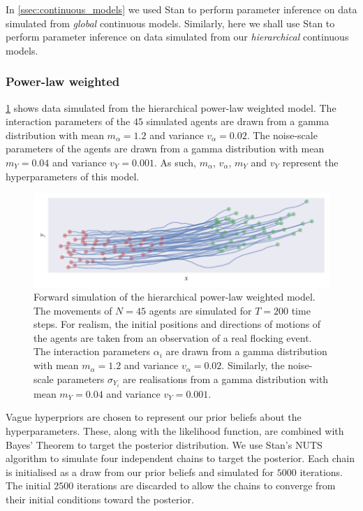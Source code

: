 In \cref{ssec:continuous_models} we used Stan to perform parameter inference on
data simulated from \emph{global} continuous models. Similarly, here we shall
use Stan to perform parameter inference on data simulated from our
\emph{hierarchical} continuous models.

\subsubsection{Power-law weighted}

\cref{fig:power_hier_sim} shows data simulated from the hierarchical power-law
weighted model. The interaction parameters of the $45$ simulated agents are
drawn from a gamma distribution with mean $m_{\alpha}=1.2$ and variance
$v_{\alpha}=0.02$. The noise-scale parameters of the agents are drawn from a
gamma distribution with mean $m_Y=0.04$ and variance $v_Y=0.001$. As such,
$m_{\alpha}$, $v_{\alpha}$, $m_Y$ and $v_Y$ represent the hyperparameters of
this model.

\begin{figure}[tbp]
  \includegraphics{power_hier_sim.pdf}
  \caption{Forward simulation of the hierarchical power-law weighted model. The
    movements of $N=45$ agents are simulated for $T=200$ time steps. For
    realism, the initial positions and directions of motions of the agents
    are taken from an observation of a real flocking event. The interaction
    parameters $\alpha_i$ are drawn from a gamma distribution with mean
    $m_{\alpha}=1.2$ and variance $v_{\alpha}=0.02$. Similarly, the
    noise-scale parameters $\sigma_{Y_i}$ are realisations from a gamma
    distribution with mean $m_Y=0.04$ and variance $v_Y=0.001$.}
  \label{fig:power_hier_sim}
\end{figure}

Vague hyperpriors are chosen to represent our prior beliefs about the
hyperparameters. These, along with the likelihood function, are combined with
Bayes' Theorem to target the posterior distribution.  We use Stan's NUTS
algorithm to simulate four independent chains to target the posterior.  Each
chain is initialised as a draw from our prior beliefs and simulated for $5000$
iterations. The initial $2500$ iterations are discarded to allow the chains to
converge from their initial conditions toward the posterior.

